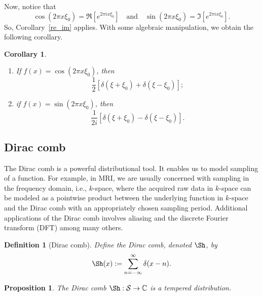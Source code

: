 \documentclass[12pt, letterpaper]{article}
\theoremstyle{plain}
\newtheorem{corollary}[theorem]{Corollary}
\newtheorem{definition}[theorem]{Definition}
\newtheorem{proposition}[theorem]{Proposition}
\begin{document}
Now, notice that 
\begin{equation}
     \cos(2 \pi x \xi_0) = \Re[e^{2\pi i x \xi_0}] \quad \text{and} \quad \sin(2 \pi x \xi_0) = \Im[e^{2\pi i x \xi_0}].
\end{equation}
So, Corollary~\ref{re_im} applies. With some algebraic manipulation, we obtain the following corollary.

\begin{corollary}
    \quad
    \begin{enumerate}
        \item If $f(x) = \cos(2\pi x \xi_0)$, then
        \begin{equation}
            \frac{1}{2}\left[\delta(\xi + \xi_0) + \delta(\xi - \xi_0)\right];
        \end{equation}
        \item if $f(x) = \sin(2\pi x \xi_0)$, then
        \begin{equation}
            \frac{1}{2i}\left[\delta(\xi + \xi_0) - \delta(\xi - \xi_0)\right].
        \end{equation}
    \end{enumerate}
\end{corollary}

\subsection{Dirac comb}\label{sec35}

The Dirac comb is a powerful distributional tool. It enables us to model sampling of a function. For example, in MRI, we are usually concerned with sampling in the frequency domain, i.e., $k$-space, where the acquired raw data in $k$-space can be modeled as a pointwise product between the underlying function in $k$-space and the Dirac comb with an appropriately chosen sampling period. Additional applications of the Dirac comb involves aliasing and the discrete Fourier transform (DFT) among many others.

\begin{definition}[Dirac comb]
    Define the Dirac comb, denoted $\Sh$, by
    \begin{equation}
        \Sh(x) := \sum_{n = -\infty}^\infty \delta(x - n).
    \end{equation}
\end{definition}

\begin{proposition}
    The Dirac comb $\Sh: \mathcal{S} \to \mathbb{C}$ is a tempered distribution. 
\end{proposition}
\end{document}
